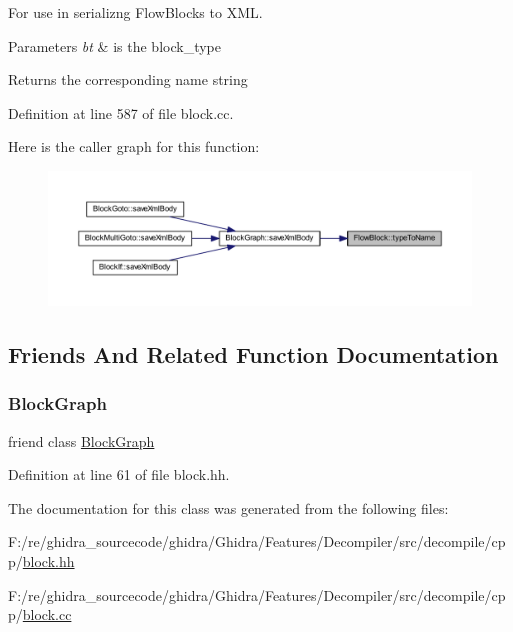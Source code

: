 For use in serializng Flow\+Blocks to X\+ML. 
\begin{DoxyParams}{Parameters}
{\em bt} & is the block\+\_\+type \\
\hline
\end{DoxyParams}
\begin{DoxyReturn}{Returns}
the corresponding name string 
\end{DoxyReturn}


Definition at line 587 of file block.\+cc.

Here is the caller graph for this function\+:
\nopagebreak
\begin{figure}[H]
\begin{center}
\leavevmode
\includegraphics[width=350pt]{class_flow_block_ade29abe8cdfae0daaeb6a65c057065c6_icgraph}
\end{center}
\end{figure}


\subsection{Friends And Related Function Documentation}
\mbox{\label{class_flow_block_a922a06f846f258741ffe743ea49198d7}} 
\subsubsection{\texorpdfstring{BlockGraph}{BlockGraph}}
{\footnotesize\ttfamily friend class \mbox{\hyperlink{class_block_graph}{Block\+Graph}}\hspace{0.3cm}{\ttfamily [friend]}}



Definition at line 61 of file block.\+hh.



The documentation for this class was generated from the following files\+:\begin{DoxyCompactItemize}
\item 
F\+:/re/ghidra\+\_\+sourcecode/ghidra/\+Ghidra/\+Features/\+Decompiler/src/decompile/cpp/\mbox{\hyperlink{block_8hh}{block.\+hh}}\item 
F\+:/re/ghidra\+\_\+sourcecode/ghidra/\+Ghidra/\+Features/\+Decompiler/src/decompile/cpp/\mbox{\hyperlink{block_8cc}{block.\+cc}}\end{DoxyCompactItemize}
